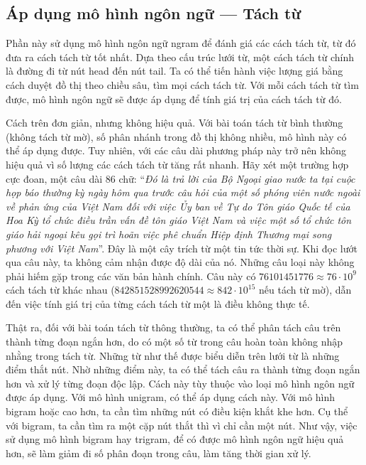 \documentclass[a4paper,oneside,14pt]{extbook} %
\begin{document}
\subsection{Áp dụng mô hình ngôn ngữ --- Tách từ}

\label{sec:language-model}

Phần này sử dụng mô hình ngôn ngữ ngram để đánh giá các cách tách từ,
từ đó đưa ra cách tách từ tốt nhất. Dựa theo cấu trúc lưới từ, một
cách tách từ chính là đường đi từ nút head đến nút tail. Ta có thể
tiến hành việc lượng giá bằng cách duyệt đồ thị theo chiều sâu, tìm
mọi cách tách từ. Với mỗi cách tách từ tìm được, mô hình ngôn ngữ sẽ
được áp dụng để tính giá trị của cách tách từ đó.

Cách trên đơn giản, nhưng không hiệu quả. Với bài toán tách từ bình
thường (không tách từ mờ), số phân nhánh trong đồ thị không nhiều, mô
hình này có thể áp dụng được. Tuy nhiên, với các câu dài phương pháp
này trở nên không hiệu quả vì số lượng các cách tách từ tăng rất
nhanh. Hãy xét một trường hợp cực đoan, một câu dài 86 chữ: ``\textit{Đó là trả
lời của Bộ Ngoại giao nước ta tại cuộc họp báo thường kỳ ngày hôm qua trước
câu hỏi của một số phóng viên nước ngoài về phản ứng của Việt Nam đối
với việc Ủy ban về Tự do Tôn giáo Quốc tế của Hoa Kỳ tổ chức điều trần
vấn đề tôn giáo Việt Nam và việc một số tổ chức tôn giáo hải ngoại kêu
gọi trì hoãn việc phê chuẩn Hiệp định Thương mại song phương với Việt
Nam}''. Đây là một cây trích từ một tin tức thời sự. Khi đọc lướt qua câu
này, ta không cảm nhận được độ dài của nó. Những câu loại này không
phải hiếm gặp trong các văn bản hành chính. Câu này có $76101451776 \approx 76\cdot 10^9$ cách
tách từ khác nhau ($842851528992620544 \approx 842\cdot 10^{15}$ nếu tách từ mờ), dẫn đến
việc tính giá trị của từng cách tách từ một là điều không thực tế.

Thật ra, đối với bài toán tách từ thông thường, ta có thể phân tách
câu trên thành từng đoạn ngắn hơn, do có một số từ trong câu hoàn toàn
không nhập nhằng trong tách từ. Những từ như thế được biểu diễn trên
lưới từ là những điểm thắt nút. Nhờ những điểm này, ta có thể tách
câu ra thành từng đoạn ngắn hơn và xử lý từng đoạn độc lập. Cách này
tùy thuộc vào loại mô hình ngôn ngữ được áp dụng. Với mô hình unigram,
có thể áp dụng cách này. Với mô hình bigram hoặc cao hơn, ta cần tìm
những nút có điều kiện khắt khe hơn. Cụ thể với bigram, ta cần tìm ra
một cặp nút thắt thì vì chỉ cần một nút. Như vậy, việc sử dụng mô hình
bigram hay trigram, để có được mô hình ngôn ngữ hiệu quả hơn,  sẽ làm
giảm đi số phân đoạn trong câu, làm tăng thời gian xử lý.
\end{document}
